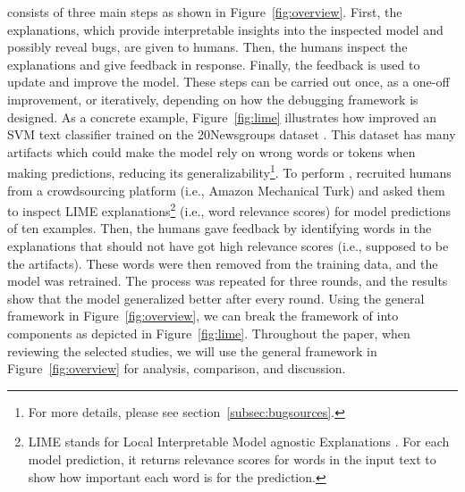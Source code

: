 \EBHD 
consists of
three main 
steps as shown in Figure~\ref{fig:overview}.
First, the explanations, which provide interpretable insights into the inspected model and possibly reveal bugs, are 
given to humans.
Then, the humans inspect the explanations and give feedback in response.
Finally, the feedback is used to update and improve the model.
These steps can be carried out once, as a one-off improvement, or iteratively, depending on how the debugging framework is designed. 
As a concrete example, Figure~\ref{fig:lime} illustrates how  improved an SVM text classifier trained on the 20Newsgroups dataset .
This dataset has many
artifacts which could make the model rely on wrong words or tokens when making predictions, reducing its generalizability\footnote{For more details, please see section~\ref{subsec:bugsources}.}. 
To perform \EBHD,  recruited humans 
from a crowdsourcing platform (i.e., Amazon Mechanical Turk) and asked them to inspect LIME explanations\footnote{LIME stands for Local Interpretable Model agnostic Explanations . For each model prediction, it returns relevance scores for words in the input text to show how important each word is for the prediction.} (i.e., word relevance scores) for model predictions of ten examples.
Then, the humans gave feedback by identifying words in the explanations that should not have got high relevance scores (i.e., supposed to be the artifacts). These words were then removed from the training data, and the model was retrained. The process was repeated for three rounds, and the results show that the model generalized better after every round. 
Using the general framework in Figure~\ref{fig:overview}, we can break the framework of  into components 
as depicted in Figure~\ref{fig:lime}.  
Throughout the paper, when reviewing 
the selected studies,
we will use the general framework in Figure~\ref{fig:overview} for analysis, comparison, and discussion.

